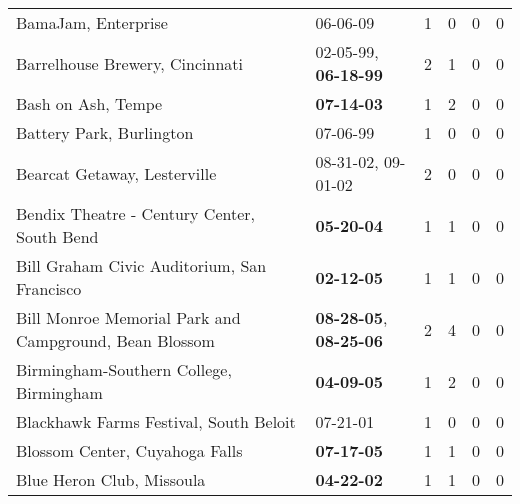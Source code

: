 \begin{longtable}{p{}p{}p{}p{}p{}p{}}
                                                          BamaJam, Enterprise &                                                06-06-09\textsuperscript{} &  1 &  0 &  0 &  0 \\
                                              Barrelhouse Brewery, Cincinnati &           02-05-99\textsuperscript{}, \textbf{06-18-99\textsuperscript{}} &  2 &  1 &  0 &  0 \\
                                                           Bash on Ash, Tempe &                                       \textbf{07-14-03\textsuperscript{}} &  1 &  2 &  0 &  0 \\
                                                     Battery Park, Burlington &                                                07-06-99\textsuperscript{} &  1 &  0 &  0 &  0 \\
                                                 Bearcat Getaway, Lesterville &                    08-31-02\textsuperscript{}, 09-01-02\textsuperscript{} &  2 &  0 &  0 &  0 \\
                                  Bendix Theatre - Century Center, South Bend &                                       \textbf{05-20-04\textsuperscript{}} &  1 &  1 &  0 &  0 \\
                                  Bill Graham Civic Auditorium, San Francisco &                                       \textbf{02-12-05\textsuperscript{}} &  1 &  1 &  0 &  0 \\
                       Bill Monroe Memorial Park and Campground, Bean Blossom &  \textbf{08-28-05\textsuperscript{}}, \textbf{08-25-06\textsuperscript{}} &  2 &  4 &  0 &  0 \\
                                      Birmingham-Southern College, Birmingham &                                       \textbf{04-09-05\textsuperscript{}} &  1 &  2 &  0 &  0 \\
                                       Blackhawk Farms Festival, South Beloit &                                                07-21-01\textsuperscript{} &  1 &  0 &  0 &  0 \\
                                               Blossom Center, Cuyahoga Falls &                                       \textbf{07-17-05\textsuperscript{}} &  1 &  1 &  0 &  0 \\
                                                    Blue Heron Club, Missoula &                                       \textbf{04-22-02\textsuperscript{}} &  1 &  1 &  0 &  0 \\

\end{longtable}
